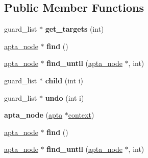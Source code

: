 \subsection*{Public Member Functions}
\begin{DoxyCompactItemize}
\item 
guard\+\_\+list $\ast$ {\bfseries get\+\_\+targets} (int)\hypertarget{classapta__node_a26b9c96df8920fdfe3db05e1c1897760}{}\label{classapta__node_a26b9c96df8920fdfe3db05e1c1897760}

\item 
\hyperlink{classapta__node}{apta\+\_\+node} $\ast$ {\bfseries find} ()\hypertarget{classapta__node_ab23b52a87dfdb6316a2ba30da7d31eb7}{}\label{classapta__node_ab23b52a87dfdb6316a2ba30da7d31eb7}

\item 
\hyperlink{classapta__node}{apta\+\_\+node} $\ast$ {\bfseries find\+\_\+until} (\hyperlink{classapta__node}{apta\+\_\+node} $\ast$, int)\hypertarget{classapta__node_a21857ccd42c6ddd9e920406a8e0321ff}{}\label{classapta__node_a21857ccd42c6ddd9e920406a8e0321ff}

\item 
guard\+\_\+list $\ast$ {\bfseries child} (int i)\hypertarget{classapta__node_a8f35cb3729fb653fd4d42723c5adac83}{}\label{classapta__node_a8f35cb3729fb653fd4d42723c5adac83}

\item 
guard\+\_\+list $\ast$ {\bfseries undo} (int i)\hypertarget{classapta__node_a26f2a8165511c6ef322c342c9cc89e79}{}\label{classapta__node_a26f2a8165511c6ef322c342c9cc89e79}

\item 
{\bfseries apta\+\_\+node} (\hyperlink{classapta}{apta} $\ast$\hyperlink{classapta__node_a95d170076f0c3f9d98f2d1701dafd2cb}{context})\hypertarget{classapta__node_ae27f86d054b6bfb50a908509969c1b09}{}\label{classapta__node_ae27f86d054b6bfb50a908509969c1b09}

\item 
\hyperlink{classapta__node}{apta\+\_\+node} $\ast$ {\bfseries find} ()\hypertarget{classapta__node_a5d339a47f63e54193f2d384244c8d61d}{}\label{classapta__node_a5d339a47f63e54193f2d384244c8d61d}

\item 
\hyperlink{classapta__node}{apta\+\_\+node} $\ast$ {\bfseries find\+\_\+until} (\hyperlink{classapta__node}{apta\+\_\+node} $\ast$, int)\hypertarget{classapta__node_a841d68d207517e998d12da726efd9498}{}\label{classapta__node_a841d68d207517e998d12da726efd9498}


\end{DoxyCompactItemize}
